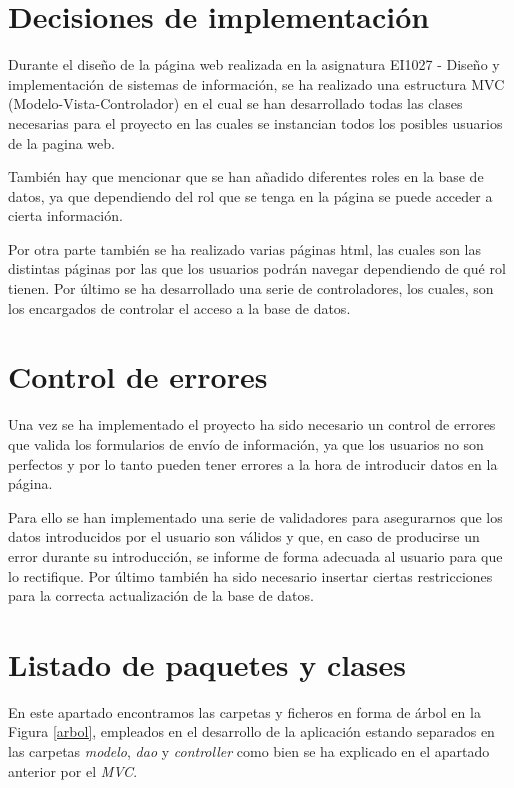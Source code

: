 \documentclass[pdftex,11pt,a4paper]{book}
\begin{document}
\section{Decisiones de implementación}

Durante el diseño de la página web realizada en la asignatura EI1027 - Diseño y implementación de sistemas de información, se ha realizado una estructura MVC (Modelo-Vista-Controlador) en el cual se han desarrollado todas las clases necesarias para el proyecto en las cuales se instancian todos los posibles usuarios de la pagina web.

También hay que mencionar que se han añadido diferentes roles en la base de datos, ya que dependiendo del rol que se tenga en la página se puede acceder a cierta información.

Por otra parte también se ha realizado varias páginas html, las cuales son las distintas páginas por las que los usuarios podrán navegar dependiendo de qué rol tienen. Por último se ha desarrollado una serie de controladores, los cuales, son los encargados de controlar el acceso a la base de datos.

\section{Control de errores}

Una vez se ha implementado el proyecto ha sido necesario un control de errores que valida los formularios de envío de información, ya que los usuarios no son perfectos y por lo tanto pueden tener errores a la hora de introducir datos en la página. 

Para ello se han implementado una serie de validadores para asegurarnos que los datos introducidos por el usuario son válidos y que, en caso de producirse un error durante su introducción, se informe de forma adecuada al usuario para que lo rectifique. Por último también ha sido necesario insertar ciertas restricciones para la correcta actualización de la base de datos. 

\section{Listado de paquetes y clases}

En este apartado encontramos las carpetas y ficheros en forma de árbol en la Figura \ref{arbol}, empleados en el desarrollo de la aplicación estando separados en las carpetas \emph{modelo}, \emph{dao} y \emph{controller} como bien se ha explicado en el apartado anterior por el \emph{MVC}.
\end{document}
